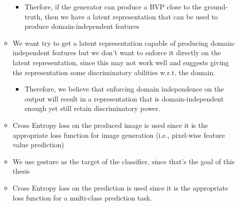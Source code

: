 \begin{itemize}
\begin{itemize}
		\begin{itemize}
			\item Therfore, if the generator can produce a BVP close to the ground-truth, then we have a latent representation that can be used to produce domain-independent features
		\end{itemize}
		\item We want try to get a latent representation capable of producing domain-independent features but we don't want to enforce it directly on the latent representation, since this may not work well \cite{van2022insights} and \cite{martini2021domain} suggests giving the representation some discriminatory abilities w.r.t. the domain.
		\begin{itemize}
			\item Therefore, we believe that enforcing domain independence on the output will result in a representation that is domain-independent enough yet still retain discriminatory power.
		\end{itemize}
		\item Cross Entropy loss on the produced image is used since it is the appropriate loss function for image generation (i.e., pixel-wise feature value prediction)
		\item We use gesture as the target of the classifier, since that's the goal of this thesis
		\item Cross Entropy loss on the prediction is used since it is the appropriate loss function for a multi-class prediction task.
		
	\end{itemize}
\end{itemize}
